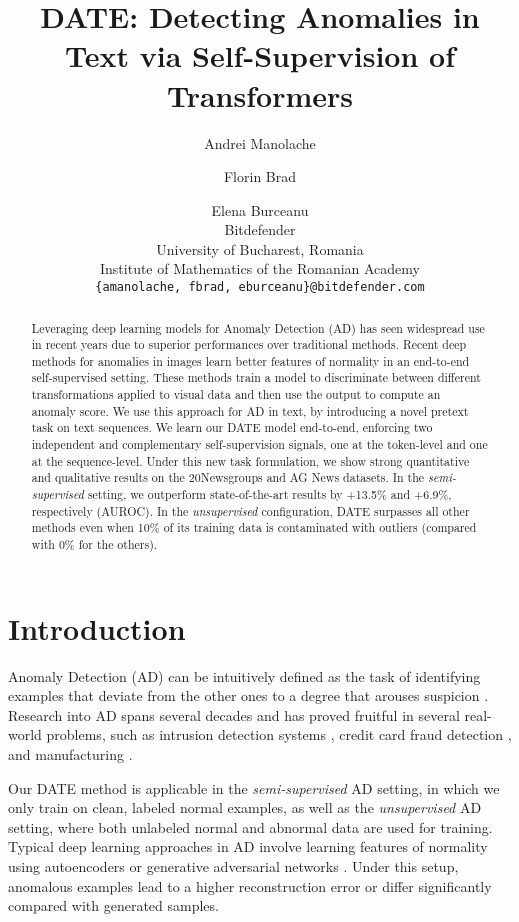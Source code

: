 \documentclass[11pt]{article}
\title{DATE: Detecting Anomalies in Text via Self-Supervision of Transformers}
\author{Andrei Manolache \and Florin Brad \and Elena Burceanu \\
        Bitdefender\\
        University of Bucharest, Romania\\
        Institute of Mathematics of the Romanian Academy\\
        \texttt{\{amanolache, fbrad, eburceanu\}@bitdefender.com}\\ }
\begin{document}
\maketitle

\begin{abstract}
Leveraging deep learning models for Anomaly Detection (AD) has seen widespread use in recent years due to superior performances over traditional methods. Recent deep methods for anomalies in images learn better features of normality in an end-to-end self-supervised setting. These methods train a model to discriminate between different transformations applied to visual data and then use the output to compute an anomaly score. We use this approach for AD in text, by introducing a novel pretext task on text sequences. We learn our DATE model end-to-end, enforcing two independent and complementary self-supervision signals, one at the token-level and one at the sequence-level. Under this new task formulation, we show strong quantitative and qualitative results on the 20Newsgroups and AG News datasets. In the \emph{semi-supervised} setting, we outperform state-of-the-art results by +13.5\% and +6.9\%, respectively (AUROC). In the \emph{unsupervised} configuration, DATE surpasses all other methods even when 10\% of its training data is contaminated with outliers (compared with 0\% for the others).

\end{abstract}


\section{Introduction}
Anomaly Detection (AD) can be intuitively defined as the task of identifying examples that deviate from the other ones to a degree that arouses suspicion \cite{Hawkins1980}. Research into AD spans several decades \cite{Chandola2009,Aggarwal2015} and has proved fruitful in several real-world problems, such as intrusion detection systems \cite{Banoth2017}, credit card fraud detection \cite{Dorronsoro1997}, and manufacturing \cite{Kammerer2019}.

Our DATE method is applicable in the \emph{semi-supervised} AD setting, in which we only train on clean, labeled normal examples, as well as the \emph{unsupervised} AD setting, where both unlabeled normal and abnormal data are used for training. Typical deep learning approaches in AD involve learning features of normality using autoencoders \cite{Hawkins2002,Sakurada2014,Chen2017} or generative adversarial networks \cite{Schlegl2017}. Under this setup, anomalous examples lead to a higher reconstruction error or differ significantly compared with generated samples.
\end{document}
